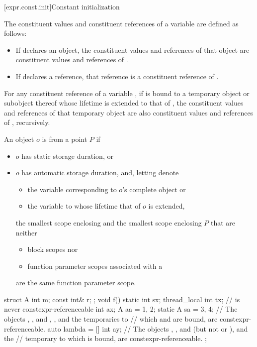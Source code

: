 [expr.const.init]{Constant initialization}

\pnum
The constituent values and constituent references of
a variable  are defined as follows:
\begin{itemize}
\item
If  declares an object,
the constituent values and references of that object are
constituent values and references of .
\item
If  declares a reference,
that reference is a constituent reference of .
\end{itemize}
For any constituent reference  of a variable ,
if  is bound to a temporary object or subobject thereof
whose lifetime is extended to that of ,
the constituent values and references of that temporary object
are also constituent values and references of , recursively.

\pnum
An object $o$ is  from a point $P$ if
\begin{itemize}
\item
$o$ has static storage duration, or
\item
$o$ has automatic storage duration, and, letting  denote
\begin{itemize}
\item
the variable corresponding to $o$'s complete object or
\item
the variable to whose lifetime that of $o$ is extended,
\end{itemize}
the smallest scope enclosing  and the smallest scope enclosing $P$
that are neither
\begin{itemize}
\item
block scopes nor
\item
function parameter scopes associated with
a 
\end{itemize}
are the same function parameter scope.
\end{itemize}
\begin{example}
\begin{codeblock}
struct A {
  int m;
  const int& r;
};
void f() {
  static int sx;
  thread_local int tx;                  //  is never constexpr-referenceable
  int ax;
  A aa = {1, 2};
  static A sa = {3, 4};
  // The objects , , and , , and the temporaries to
  // which  and  are bound, are constexpr-referenceable.
  auto lambda = [] {
    int ay;
    // The objects , , and  (but not  or ), and the
    // temporary to which  is bound, are constexpr-referenceable.
  };
}
\end{codeblock}
\end{example}

